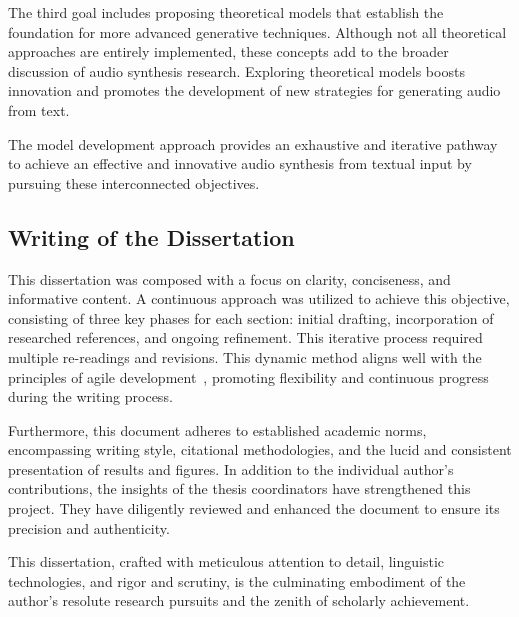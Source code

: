 The third goal includes proposing theoretical models that establish the foundation for more advanced generative techniques. Although not all theoretical approaches are entirely implemented, these concepts add to the broader discussion of audio synthesis research. Exploring theoretical models boosts innovation and promotes the development of new strategies for generating audio from text.

The model development approach provides an exhaustive and iterative pathway to achieve an effective and innovative audio synthesis from textual input by pursuing these interconnected objectives.

\subsection{Writing of the Dissertation}

This dissertation was composed with a focus on clarity, conciseness, and informative content. A continuous approach was utilized to achieve this objective, consisting of three key phases for each section: initial drafting, incorporation of researched references, and ongoing refinement. This iterative process required multiple re-readings and revisions. This dynamic method aligns well with the principles of agile development~\cite{dingsoyr_decade_2012}, promoting flexibility and continuous progress during the writing process.

Furthermore, this document adheres to established academic norms, encompassing writing style, citational methodologies, and the lucid and consistent presentation of results and figures. In addition to the individual author's contributions, the insights of the thesis coordinators have strengthened this project. They have diligently reviewed and enhanced the document to ensure its precision and authenticity.

This dissertation, crafted with meticulous attention to detail, linguistic technologies, and rigor and scrutiny, is the culminating embodiment of the author's resolute research pursuits and the zenith of scholarly achievement.